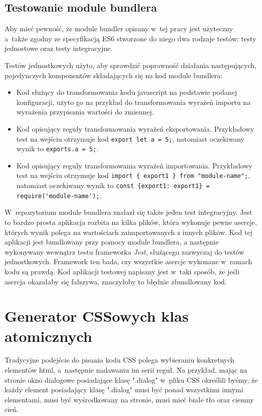 \documentclass{SGGW-thesis}
\begin{document}
\section{Testowanie module bundlera}
Aby mieć pewność, że module bundler opisany w~tej pracy jest użyteczny a~także zgodny ze specyfikacją ES6 stworzone do niego dwa rodzaje testów: testy jednostowe oraz testy integracyjne.

Testów jednostkowych użyto, aby sprawdzić poprawność działania następujących, pojedynczych komponentów składających się na kod module bundlera:
\begin{itemize}
    \item Kod służący do transformowania kodu javascript na podstawie podanej konfiguracji, użyto go na przykład do transformowania wyrażeń importu na wyrażenia przypisania wartości do zmiennej.
    \item Kod opisujący reguły transformowania wyrażeń eksportowania. Przykładowy test na wejściu otrzymuje kod \verb|export let a = 5;|, natomiast oczekiwany wynik to \verb|exports.a = 5;|.
    \item Kod opisujący reguły transformowania wyrażeń importowania. Przykładowy test na wejściu otrzymuje kod \verb|import { export1 } from "module-name";|, natomiast oczekiwany wynik to \verb|const {export1: export1} = require('module-name');|.
\end{itemize}

W~repozytorium module bundlera znalazł się także jeden test integracyjny. Jest to bardzo prosta aplikacja rozbita na kilka plików, która wykonuje pewne asercje, których wynik polega na wartościach zaimportowanych z innych plików. Kod tej aplikacji jest bundlowany przy pomocy module bundlera, a następnie wykonywany wewnątrz testu frameworka \emph{Jest}\cite{jest}, służącego zazwyczaj do testów jednostkowych. Framework ten bada, czy wszystkie asercje wykonane w~ramach kodu są prawdą. Kod aplikacji testowej napisany jest w~taki sposób, że jeśli asercja okazałaby się fałszywa, znaczyłoby to błędnie zbundlowany kod.

\chapter{Generator CSSowych klas atomicznych}
Tradycyjne podejście do pisania kodu CSS polega wybieraniu konkretnych elementów html, a~następnie nadawaniu im serii reguł. Na przykład, mając na stronie okno dialogowe posiadające klasę ".dialog" w~pliku CSS określili byśmy, że każdy element posiadający klasę ".dialog" musi być ponad wszystkimi innymi elementami, musi być wyśrodkowany na stronie, musi mieć białe tło oraz ciemny cień.
\end{document}
